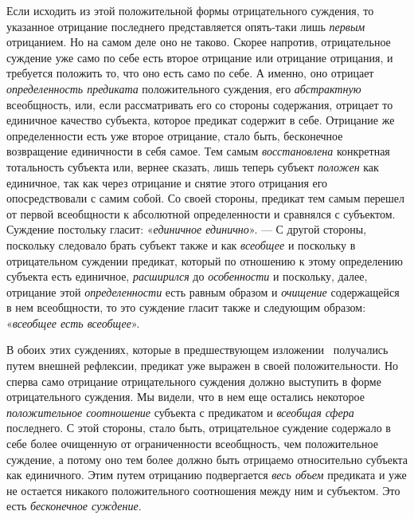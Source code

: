 \documentclass[twoside]{article}
\begin{document}
{{{Если исходить из этой положительной формы отрицательного
суждения, то указанное отрицание последнего представляется опять-таки лишь
{\em первым} отрицанием.
Но на самом деле оно не таково. Скорее напротив, отрицательное суждение уже
само по себе есть второе отрицание или отрицание отрицания, и требуется
положить то, что оно есть само по себе. А именно, оно отрицает
{\em определенность предиката}
положительного суждения, его
{\em абстрактную}
всеобщность, или, если рассматривать его со стороны
содержания, отрицает то единичное качество субъекта, которое предикат
содержит в себе. Отрицание же определенности есть уже второе отрицание,
стало быть, бесконечное возвращение единичности в себя самое. Тем самым
{\em восстановлена}
конкретная тотальность субъекта или, вернее сказать, лишь
теперь субъект {\em положен}
как единичное, так как через отрицание и снятие этого
отрицания его опосредствовали с самим собой. Со своей стороны, предикат тем
самым перешел от первой всеобщности к абсолютной определенности и сравнялся
с субъектом. Суждение постольку гласит:
«{\em единичное единично}». —
С другой стороны, поскольку следовало брать субъект также и
как {\em всеобщее} и
поскольку в отрицательном суждении предикат, который по отношению к этому
определению субъекта есть единичное,
{\em расширился} до
{\em особенности} и
поскольку, далее, отрицание этой
{\em определенности} есть
равным образом и {\em очищение}
содержащейся в нем всеобщности, то это суждение гласит также
и следующим образом: «{\em всеобщее есть всеобщее}».

В обоих этих суждениях, которые в предшествующем
изложении~\label{bkm:bm35}
получались путем внешней рефлексии, предикат уже выражен в
своей положительности. Но сперва само отрицание отрицательного суждения
должно выступить в форме отрицательного суждения. Мы видели, что в нем еще
остались некоторое {\em положительное
соотношение} субъекта с предикатом и
{\em всеобщая сфера}
последнего. С этой стороны, стало быть,
отрицательное суждение содержало в себе более очищенную от ограниченности
всеобщность, чем положительное суждение, а потому оно тем более должно быть
отрицаемо относительно субъекта как единичного. Этим путем отрицанию
подвергается {\em весь объем}
предиката и уже не остается никакого положительного
соотношения между ним и субъектом. Это есть
{\em бесконечное суждение}.

}}}
\end{document}

